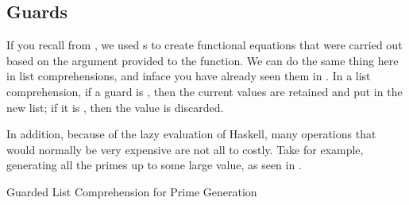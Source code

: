 \subsection{Guards}\label{subsec:List_Comprehension_Guards}
If you recall from , we used s to create functional equations that were carried out based on the argument provided to the function.
We can do the same thing here in list comprehensions, and inface you have already seen them in .
In a list comprehension, if a guard is , then the current values are retained and put in the new list; if it is , then the value is discarded.

In addition, because of the lazy evaluation of Haskell, many operations that would normally be very expensive are not all to costly.
Take for example, generating all the primes up to some large value, as seen in .
\begin{listing}[h!tbp]
\caption{Guarded List Comprehension for Prime Generation}
\label{lst:List_Comprehension_Guards}
\end{listing}

